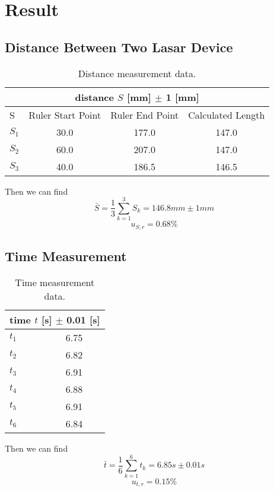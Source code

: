 \section{Result}
\subsection{Distance Between Two Lasar Device}

\begin{table}[H]
  \centering
  \begin{tabular}{|l|c |c |c |}
    \hline
    \multicolumn{4}{|c|}{distance $S$ [mm] $\pm$ 1 [mm]} \\
    \hline
    S &  Ruler Start Point & Ruler End Point & Calculated Length \\
    \hline
    $S_1$ & 30.0 & 177.0 & 147.0 \\ \hline
    $S_2$ & 60.0 & 207.0 & 147.0 \\ \hline
    $S_3$ & 40.0 & 186.5 & 146.5 \\ \hline
  \end{tabular}
  \caption{Distance measurement data.}
\end{table}

Then we can find
$$  \bar{S} = \frac{1}{3} \sum_{k=1}^{3} S_k = 146.8 mm \pm 1 mm   $$
$$  u_{S,r} = 0.68 \%  $$ 


\subsection{Time Measurement}

\begin{table}[H]
  \centering
  \begin{tabular}{|l|c|}
    \hline
    \multicolumn{2}{|c|}{time $t$ [s] $\pm$ 0.01 [s] } \\
    \hline
    $t_1$ & 6.75 \\ \hline
    $t_2$ & 6.82 \\ \hline
    $t_3$ & 6.91 \\ \hline
    $t_4$ & 6.88 \\ \hline
    $t_5$ & 6.91 \\ \hline
    $t_6$ & 6.84 \\ \hline
  \end{tabular}
  \caption{Time measurement data.}
\end{table}


Then we can find
$$  \bar{t} = \frac{1}{6} \sum_{k=1}^{6} t_k =6.85 s \pm 0.01 s   $$
$$  u_{t,r} = 0.15 \%  $$ 

